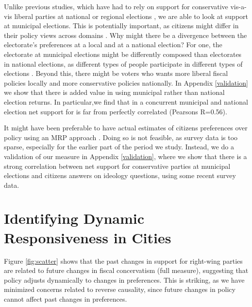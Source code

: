 \documentclass[a4paper,12pt]{article}
\begin{document}
 Unlike previous studies, which have had to rely on support for conservative vis-a-vis liberal parties at national or regional elections \citep[e.g.,]{hajnal2010or,einstein2016pushing}, we are able to look at support at municipal elections. This is potentially important, as citizens might differ in their policy views across domains \cite[for an argument along these lines, see]{abrams2012big}.  Why might there be a divergence between the electorate's preferences at a local and at a national election?  For one, the electorate at municipal elections might be differently composed than electorates in national elections, as different types of people participate in different types of elections \citep{ansolabehere2015beyond,hansen2017social}. Beyond this, there might be voters who wants more liberal fiscal policies locally and more conservative policies nationally. In Appendix  \ref{validation} we show that there is added value in using municipal rather than national election returns. In particular,we find that in a concurrent municipal and national election net support for is far from perfectly correlated (Pearsons R=0.56).
 
 It might have been preferable to have actual estimates of citizens preferences over policy using an MRP approach \citep[similar to the measure used by][]{tausanovitch2014representation}. Doing so is not feasible, as survey data is too sparse, especially for the earlier part of the period we study. Instead, we do a validation of our measure in Appendix \ref{validation}, where we show that there is a strong correlation between net support for conservative parties at municipal elections and citizens answers on ideology questions, using some recent survey data.


\section*{Identifying Dynamic Responsiveness in Cities}
Figure \ref{fig:scatter} shows that the past changes in support for right-wing parties are related to future changes in fiscal concervatism (full measure), suggesting that  policy adjusts dynamically to changes in preferences. This is striking, as we have minimized concerns related to reverse causality, since  future changes in policy cannot affect past changes in preferences.
\end{document}
